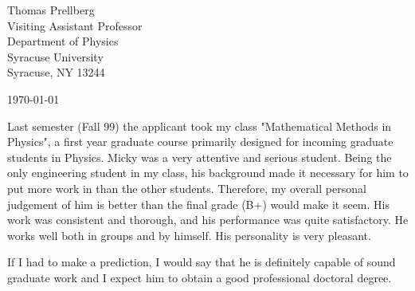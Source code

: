 
\voffset=-1.2cm
\hoffset=-1.2cm
\textwidth=16cm
\textheight=23cm
\renewcommand{\baselinestretch}{1.6}
       


\vspace{1cm}

\noindent Thomas Prellberg\\
Visiting Assistant Professor\\
Department of Physics\\
Syracuse University\\
Syracuse, NY 13244
\vspace{1cm}

\today
\vspace{1cm}
 
Last semester (Fall 99) the applicant took my class "Mathematical Methods in Physics",
a first year graduate course primarily designed for incoming graduate students in Physics. 
Micky was a very attentive and serious student. Being the only engineering student in my
class, his background made it necessary for him to put more work in than the other students. 
Therefore, my overall personal judgement of him is better than the final grade (B+) would make it 
seem. His work was consistent and thorough, and his performance was quite satisfactory.
He works well both in groups and by himself. His personality is very pleasant.

If I had to make a prediction, I would say that he is definitely capable of sound graduate work
and I expect him to obtain a good professional doctoral degree.


